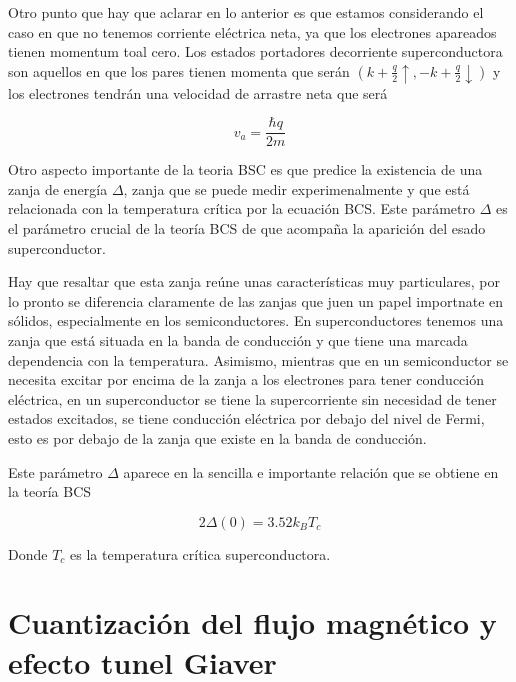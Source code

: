 Otro punto que hay que aclarar en lo anterior es que estamos considerando el caso en que no tenemos corriente eléctrica neta, ya que los electrones apareados tienen momentum toal cero. Los estados portadores  decorriente superconductora son aquellos en que los pares tienen momenta que serán $(k + \frac{q}{2} \uparrow, -k + \frac{q}{2} \downarrow)$ y los electrones tendrán una velocidad de arrastre neta que será

\begin{equation}
    v_a = \frac{\hbar q}{2m}
\end{equation}

Otro aspecto importante de la teoria BSC es que predice la existencia de una zanja de energía $\Delta$, zanja que se puede medir experimenalmente y que está relacionada con la temperatura crítica por la ecuación BCS. Este parámetro $\Delta$ es el parámetro crucial de la teoría BCS de que acompaña la aparición del esado superconductor.

Hay que resaltar que esta zanja reúne unas características muy particulares, por lo pronto se diferencia claramente de las zanjas que juen un papel importnate en sólidos, especialmente en los semiconductores. En superconductores tenemos una zanja que está situada en la banda de conducción y que tiene una marcada dependencia con la temperatura. Asimismo, mientras que en un semiconductor se necesita excitar por encima de la zanja a los electrones para tener conducción eléctrica, en un superconductor se tiene la supercorriente sin necesidad de tener estados excitados, se tiene conducción eléctrica por debajo del nivel de Fermi, esto es por debajo de la zanja que existe en la banda de conducción.

Este parámetro $\Delta$ aparece en la sencilla e importante relación que se obtiene en la teoría BCS

\begin{equation}
    2 \Delta(0) = 3.52 k_B T_c
\end{equation}

Donde $T_c$ es la temperatura crítica superconductora.

\section{Cuantización del flujo magnético y efecto tunel Giaver}

